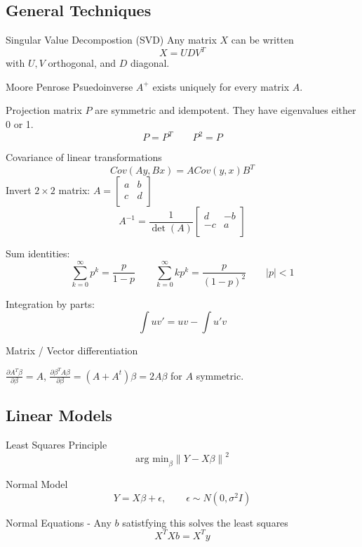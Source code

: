 \documentclass[10pt, twocolumn]{article}
\newcommand{\norm}[1]{\left\lVert#1\right\rVert}
\begin{document}
\newpage

\subsection*{General Techniques}

Singular Value Decompostion (SVD) Any matrix $X$ can be written
\[
    X = UDV^T
\]
with $U, V$ orthogonal, and $D$ diagonal.

Moore Penrose Psuedoinverse $A^+$ exists uniquely for every matrix $A$.

Projection matrix $P$ are symmetric and idempotent. They have eigenvalues
either 0 or 1.
\[
    P = P^T \qquad P^2 = P
\]

Covariance of linear transformations
\[
    Cov(Ay, Bx) = A Cov(y, x) B^T
\]
Invert $2 \times 2$ matrix:
$
    A = 
    [\begin{smallmatrix}
        a & b \\
        c & d \\
    \end{smallmatrix}]
$
\[
    A^{-1} = 
    \frac{1}{\det (A)}
    \begin{bmatrix}
        d & -b \\
        -c & a \\
    \end{bmatrix}
\]

Sum identities:
\[
    \sum_{k=0}^{\infty} p^k = \frac{p}{1 - p} \qquad 
    \sum_{k=0}^{\infty} k p^k = \frac{p}{(1 - p)^2} \qquad |p| < 1
\]

Integration by parts:
\[
    \int uv' = uv - \int u'v
\]

Matrix / Vector differentiation

$\frac{\partial A^T \beta}{\partial \beta} = A$, 
$\frac{\partial \beta^T A \beta}{\partial \beta} = (A + A^t) \beta =
2A\beta$ for $A$ symmetric.


\newpage

\subsection*{Linear Models}

Least Squares Principle
\[
    \text{arg min}_\beta \norm{Y - X\beta}^2
\]

Normal Model 
\[
    Y = X\beta + \epsilon, \qquad \epsilon \sim N(0, \sigma^2 I)
\]

Normal Equations - Any $b$ satistfying this solves the least squares
\[
    X^T X b = X^T y
\]
\end{document}
